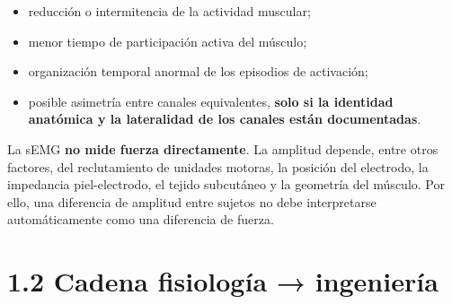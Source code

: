 \documentclass[
  spanish,
  a4paper,
  DIV=11,
  numbers=noendperiod]{scrreprt}
\providecommand{\tightlist}{%
  \setlength{\itemsep}{0pt}\setlength{\parskip}{0pt}}
\begin{document}
\begin{itemize}
\tightlist
\item
  reducción o intermitencia de la actividad muscular;
\item
  menor tiempo de participación activa del músculo;
\item
  organización temporal anormal de los episodios de activación;
\item
  posible asimetría entre canales equivalentes, \textbf{solo si la
  identidad anatómica y la lateralidad de los canales están
  documentadas}.
\end{itemize}

\begin{tcolorbox}[enhanced jigsaw, arc=.35mm, bottomrule=.15mm, bottomtitle=1mm, breakable, colback=white, colbacktitle=quarto-callout-warning-color!10!white, colframe=quarto-callout-warning-color-frame, coltitle=black, left=2mm, leftrule=.75mm, opacityback=0, opacitybacktitle=0.6, rightrule=.15mm, title=\textcolor{quarto-callout-warning-color}{\faExclamationTriangle}\hspace{0.5em}{Advertencia metodológica}, titlerule=0mm, toprule=.15mm, toptitle=1mm]

La sEMG \textbf{no mide fuerza directamente}. La amplitud depende, entre
otros factores, del reclutamiento de unidades motoras, la posición del
electrodo, la impedancia piel-electrodo, el tejido subcutáneo y la
geometría del músculo. Por ello, una diferencia de amplitud entre
sujetos no debe interpretarse automáticamente como una diferencia de
fuerza.

\end{tcolorbox}

\section{1.2 Cadena fisiología →
ingeniería}\label{cadena-fisiologuxeda-ingenieruxeda}
\end{document}
